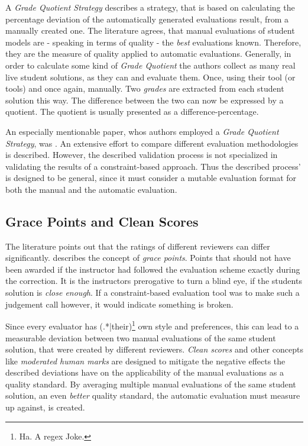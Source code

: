 A \textit{Grade Quotient Strategy} describes a strategy, that is based on calculating the
percentage deviation of the automatically generated evaluations result, from a manually 
created one. The literature agrees, that manual evaluations of student models are - speaking 
in terms of quality - the \textit{best} evaluations known. Therefore, they are the measure 
of quality applied to automatic evaluations. 
Generally, in order to calculate some kind of \textit{Grade Quotient} the authors collect as 
many real live student solutions, as they can and evaluate them. Once, using their tool 
(or tools\cite{25}) and once again, manually. Two \textit{grades} are extracted from each 
student solution this way. The difference between the two can now be expressed by a quotient.
The quotient is usually presented as a difference-percentage.

An especially mentionable paper, whos authors employed a \textit{Grade Quotient Strategy}, was 
\cite{25}. An extensive effort to compare different evaluation methodologies is described.
However, the described validation process is not specialized in validating the results of a
constraint-based approach. Thus the described process' is designed to be general, since it must 
consider a mutable evaluation format for both the manual and the automatic evaluation.



\subsection{Grace Points and Clean Scores}

The literature points out that the ratings of different reviewers can differ significantly.
\cite{1} describes the concept of \textit{grace points}. Points that should not have been 
awarded if the instructor had followed the evaluation scheme exactly during the correction.
It is the instructors prerogative to turn a blind eye, if the students solution is 
\textit{close enough}. If a constraint-based evaluation tool was to make such a judgement call
however, it would indicate something is broken. 

Since every evaluator has (.*|their)\footnote{Ha. A regex Joke.} own style and preferences,
this can lead to a measurable deviation between two manual evaluations of the same student 
solution, that were created by different reviewers. \textit{Clean scores} and other concepts
like \textit{moderated human marks}\cite{28} are designed to mitigate the negative effects 
the described deviations have on the applicability of the manual evaluations as a quality 
standard. By averaging multiple manual evaluations of the same student solution, an even
\textit{better} quality standard, the automatic evaluation must measure up against, is created. 

